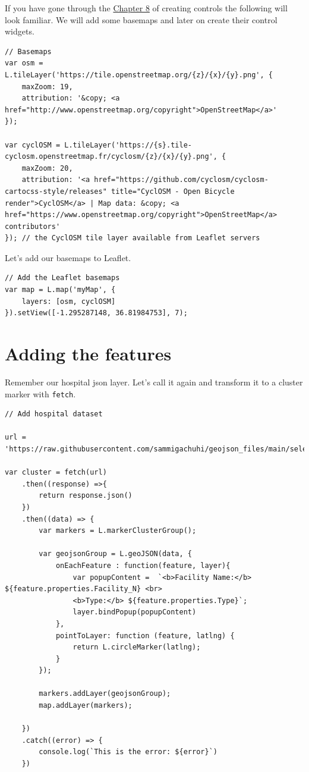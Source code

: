 \documentclass[
]{book}
\begin{document}
If you have gone through the \protect\hyperlink{layer-groups-and-controls}{Chapter 8} of creating controls the following will look familiar. We will add some basemaps and later on create their control widgets.

\begin{verbatim}
// Basemaps
var osm = L.tileLayer('https://tile.openstreetmap.org/{z}/{x}/{y}.png', {
    maxZoom: 19,
    attribution: '&copy; <a href="http://www.openstreetmap.org/copyright">OpenStreetMap</a>'
});

var cyclOSM = L.tileLayer('https://{s}.tile-cyclosm.openstreetmap.fr/cyclosm/{z}/{x}/{y}.png', {
    maxZoom: 20,
    attribution: '<a href="https://github.com/cyclosm/cyclosm-cartocss-style/releases" title="CyclOSM - Open Bicycle render">CyclOSM</a> | Map data: &copy; <a href="https://www.openstreetmap.org/copyright">OpenStreetMap</a> contributors'
}); // the CyclOSM tile layer available from Leaflet servers
\end{verbatim}

Let's add our basemaps to Leaflet.

\begin{verbatim}
// Add the Leaflet basemaps
var map = L.map('myMap', {
    layers: [osm, cyclOSM]
}).setView([-1.295287148, 36.81984753], 7);
\end{verbatim}

\hypertarget{adding-the-features}{%
\section{Adding the features}\label{adding-the-features}}

Remember our hospital json layer. Let's call it again and transform it to a cluster marker with \texttt{fetch}.

\begin{verbatim}
// Add hospital dataset

url = 'https://raw.githubusercontent.com/sammigachuhi/geojson_files/main/selected_hospitals.json'

var cluster = fetch(url)
    .then((response) =>{
        return response.json()
    })
    .then((data) => {
        var markers = L.markerClusterGroup();

        var geojsonGroup = L.geoJSON(data, {
            onEachFeature : function(feature, layer){
                var popupContent =  `<b>Facility Name:</b> ${feature.properties.Facility_N} <br>
                <b>Type:</b> ${feature.properties.Type}`;
                layer.bindPopup(popupContent)
            },
            pointToLayer: function (feature, latlng) {
                return L.circleMarker(latlng);
            }
        });

        markers.addLayer(geojsonGroup);
        map.addLayer(markers);

    })
    .catch((error) => {
        console.log(`This is the error: ${error}`)
    })
\end{verbatim}
\end{document}
